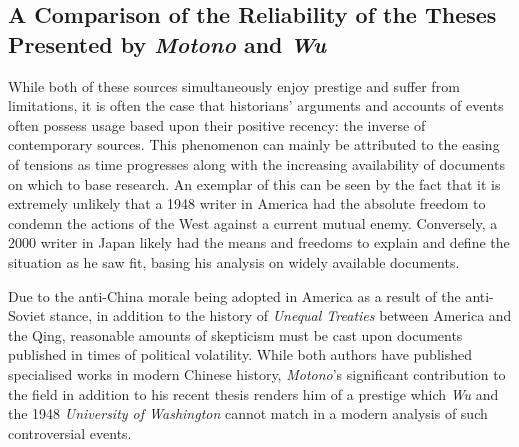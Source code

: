 \documentclass{article}
\begin{document}
\subsection{A Comparison of the Reliability of the Theses Presented by \textit{Motono} and \textit{Wu}}

        While both of these sources simultaneously enjoy prestige and suffer from limitations, it is often the case that historians' arguments and accounts of events often possess usage based upon their positive recency: the inverse of contemporary sources. This phenomenon can mainly be attributed to the easing of tensions as time progresses along with the increasing availability of documents on which to base research. An exemplar of this can be seen by the fact that it is extremely unlikely that a 1948 writer in America had the absolute freedom to condemn the actions of the West against a current mutual enemy. Conversely, a 2000 writer in Japan likely had the means and freedoms to explain and define the situation as he saw fit, basing his analysis on widely available documents.

        Due to the anti-China morale being adopted in America as a result of the anti-Soviet stance, in addition to the history of \textit{Unequal Treaties} between America and the Qing, reasonable amounts of skepticism must be cast upon documents published in times of political volatility. While both authors have published specialised works in modern Chinese history, \textit{Motono}'s significant contribution to the field in addition to his recent thesis renders him of a prestige which \textit{Wu} and the 1948 \textit{University of Washington} cannot match in a modern analysis of such controversial events.

\pagebreak
\printbibliography[title={Cited Works}, heading=bibintoc]
\end{document}
